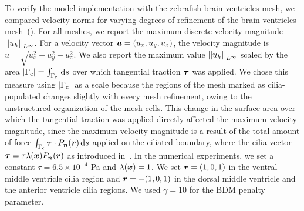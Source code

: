 \documentclass{WileyMSP-template}
\begin{document}
To verify the model implementation with the zebrafish brain ventricles mesh,
we compared velocity norms for varying degrees of refinement of the brain ventricles
mesh~().
For all meshes, we report the maximum discrete velocity magnitude ${\vert\vert u_h\vert\vert}_{L^{\infty}}$.
For a velocity vector $\bm{u}=(u_x, u_y, u_z)$, the velocity magnitude is
$u = \sqrt{u_x^2 + u_y^2 + u_z^2}$. We also report the maximum value
${\vert\vert u_h\vert\vert}_{L^{\infty}}$ scaled by the area $|\Gamma_{\mathrm{c}}|=\int_{\Gamma_{\mathrm{c}}} \, \mathrm ds$ over which tangential traction
$\bm{\tau}$ was applied. We chose this measure using $|\Gamma_{\mathrm{c}}|$ as a scale because the regions
of the mesh marked as cilia-populated changes slightly with every mesh refinement,
owing to the unstructured organization of the mesh cells. This change in the surface
area over which the tangential traction was applied directly affected
the maximum velocity magnitude,
since the maximum velocity magnitude is a result of the total amount of force
$\int_{\Gamma_{\mathrm{c}}}\bm{\tau}\cdot P_{\bm{n}}(\bm{r}) \, \mathrm ds$ applied on the ciliated boundary, where the cilia
vector $\bm{\tau} = \tau\lambda(\bm{x}) P_{\bm{n}}(\bm{r})$ as introduced in~.
In the numerical experiments, we set a constant $\tau = 6.5\times 10^{-4}$ Pa and
$\lambda(\bm{x})=1$. We set $\bm{r} = (1, 0, 1)$ in the ventral middle ventricle cilia region
and $\bm{r} = -(1, 0, 1)$ in the dorsal middle ventricle and the anterior ventricle cilia
regions. We used $\gamma=10$ for the BDM penalty parameter.
\end{document}
